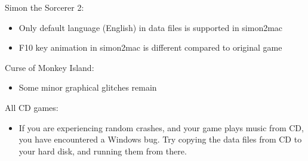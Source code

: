 Simon the Sorcerer 2:
  \begin{itemize}
  \item Only default language (English) in data files is supported in simon2mac
  \item F10 key animation in simon2mac is different compared to
        original game
  \end{itemize}
Curse of Monkey Island:
  \begin{itemize}
  \item Some minor graphical glitches remain
  \end{itemize}
All CD games:
  \begin{itemize}
  \item If you are experiencing random crashes, and your game
                 plays music from CD, you have encountered a Windows bug.
                 Try copying the data files from CD to your hard disk, and
                 running them from there.
  \end{itemize}